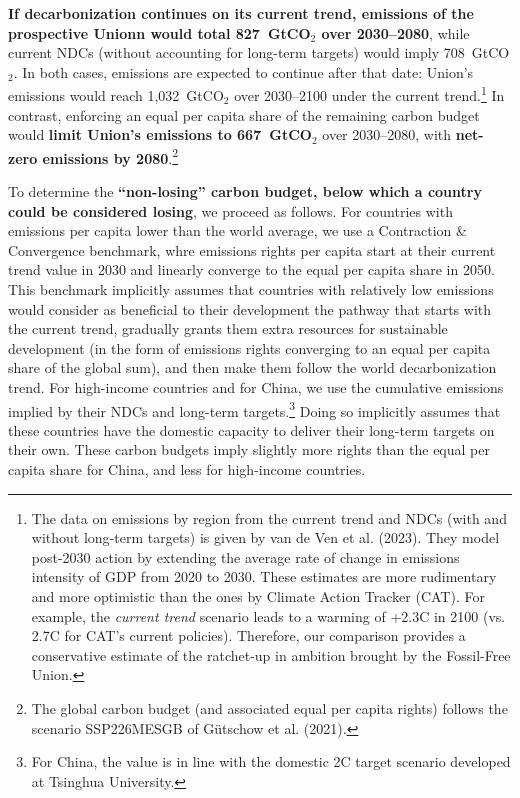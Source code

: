 \documentclass[12pt,english]{article}
\begin{document}
\textbf{If decarbonization continues on its current trend, emissions of the prospective Unionn would total 827~GtCO$_\text{2}$ over 2030--2080}, while current NDCs (without accounting for long-term targets) would imply 708~GtCO$_\text{2}$. In both cases, emissions are expected to continue after that date: Union's emissions would reach 1,032~GtCO$_\text{2}$ over 2030--2100 under the current trend.\footnote{The data on emissions by region from the current trend and NDCs (with and without long-term targets) is given by van de Ven et al. (2023)\cite{van_de_ven_multimodel_2023}. They model post-2030 action by extending the average rate of change in emissions intensity of GDP from 2020 to 2030. These estimates are more rudimentary and more optimistic than the ones by Climate Action Tracker (CAT). For example, the \textit{current trend} scenario leads to a warming of +2.3\textdegree{}C in 2100 (vs. 2.7\textdegree{}C for CAT's current policies). Therefore, our comparison provides a conservative estimate of the ratchet-up in ambition brought by the Fossil-Free Union.} %
In contrast, enforcing an equal per capita share of the remaining carbon budget would \textbf{limit Union's emissions to 667~GtCO$_\text{2}$} over 2030--2080, with \textbf{net-zero emissions by 2080}.\footnote{The global carbon budget (and associated equal per capita rights) follows the scenario SSP226MESGB of Gütschow et al. (2021).\cite{gutschow_country-resolved_2021}}

To determine the \textbf{``non-losing'' carbon budget, below which a country could be considered losing}, we proceed as follows. For countries with emissions per capita lower than the world average, we use a Contraction \& Convergence benchmark, whre emissions rights per capita start at their current trend value in 2030 and linearly converge to the equal per capita share in 2050. This benchmark implicitly assumes that countries with relatively low emissions would consider as beneficial to their development the pathway that starts with the current trend, gradually grants them extra resources for sustainable development (in the form of emissions rights converging to an equal per capita share of the global sum), and then make them follow the world decarbonization trend. 
For high-income countries and for China, we use the cumulative emissions implied by their NDCs and long-term targets.\footnote{For China, the value is in line with the domestic 2\textdegree{}C target scenario developed at Tsinghua University.\cite{he_towards_2022}} Doing so implicitly assumes that these countries have the domestic capacity to deliver their long-term targets on their own. These carbon budgets imply slightly more rights than the equal per capita share for China, and less for high-income countries. 
\end{document}

